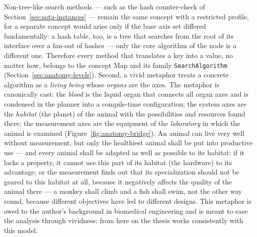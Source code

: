 \begin{nurlang}
Non-tree-like search methods --- such as the hash counter-check of Section~\ref{sec:sota-instances} ---
remain the same concept with a restricted profile, for a separate concept would arise only if the
base axis set differed fundamentally: a hash table, too, is a tree that searches from the root
of its interface over a fan-out of hashes --- only the core algorithm of the node is a
different one. Therefore every method that translates a key into a value, no matter how, belongs to the
concept Map and its family \texttt{SearchAlgorithm} (Section~\ref{sec:anatomy-levels}). Second,
a vivid metaphor treats a concrete algorithm as a \emph{living being} whose
\emph{organs} are the axes. The metaphor is canonically cast: the \emph{blood} is the liquid
organ that connects all organ axes and is condensed in the planner into a compile-time configuration;
the system axes are the \emph{habitat} (the planet) of the animal with the possibilities and
resources found there; the measurement axes are the equipment of the \emph{laboratory} in which the
animal is examined (Figure~\ref{fig:anatomy-bridge}). An animal can live very well without measurement,
but only the healthiest animal shall be put into productive use --- and every animal shall be
adapted as well as possible to its habitat: if it lacks a property, it cannot use this part of
its habitat (the hardware) to its advantage; or the measurement finds out that its
specialization should not be geared to this habitat at all, because it negatively affects the quality of the animal
there --- a monkey shall climb and a fish shall swim, not the other way round, because
different objectives have led to different designs. This metaphor is owed to the
author's background in biomedical engineering and is meant to ease the analysis through
vividness; from here on the thesis works consistently with this model.
\end{nurlang}
